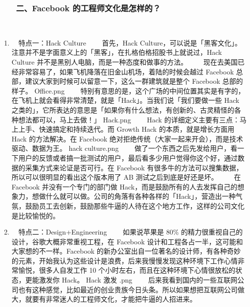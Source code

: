 \documentclass[11pt]{ctexart}
\begin{document}
\subsubsection{　　二、Facebook 的工程师文化是怎样的？}
\label{sec:orgheadline22}
　

\begin{enumerate}
\item 　特点一：Hack Culture
\label{sec:orgheadline19}
　　首先，Hack Culture，可以说是「黑客文化」。注意并不是字面意义上的「黑客」，在扎格伯格招股书上就说过，Hack Culture 并不是黑别人电脑，而是一种态度和做事的方法。
　　现在去美国已经非常容易了，如果飞机降落在旧金山机场，着陆的时候会越过 Facebook 总部，建议大家到时候可以留意一下，这么一群建筑就是整个 Facebook 总部的样子。
Office.png
　　特别有意思的是，这个广场的中间位置其实是有字的，在飞机上就会看得非常清楚，就是「Hack」。当我们说「我们要做一些 Hack 之类的」，它所表达的意思是「如果你有什么想法，有创新的、古灵精怪的各种想法都可以，马上去做！」
Hack.png
　　Hack 的详细定义主要有三点：马上上手、快速搞定和持续迭代。而 Growth Hack 的本质，就是增长方面用 Hack 的方法解决。在 Facebook 绝对拒绝传统（大家一起来开会），而是技术驱动、数据为王。
hack culture.png
　　做了一个东西之后先发给用户，看一下用户的反馈或者搞一批测试的用户，最后看多少用户觉得你这个好，通过数据的采集方式来论证是否可行。在 Facebook 有很多牛的方法可以搜集数据，所以可以很明显的看出这个版本用了 AB 测试之后到底是好还是坏。
　　在 Facebook 并没有一个专门的部门做 Hack，而是鼓励所有的人去发挥自己的想象力，想做什么就可以做。公司的角落有各种各样的「Hack」，营造出一种气氛，鼓励员工去创新，鼓励那些牛逼的人待在这个地方工作，这样的公司文化是比较愉悦的。
　

\item 　特点二：Design+Engineering
\label{sec:orgheadline20}
　　如果说苹果是 80\% 的精力很重视自己的设计，谷歌大概非常重视工程，在 Facebook 设计和工程各占一半，这可能和大家想的不一样。Facebook 的新办公室出自一位著名的设计师，有各种奇妙的元素，开始我认为这些设计是浪费，后来我慢慢发现这种环境下工作心情非常愉悦，很多人自发工作 10 个小时左右，而且在这种环境下心情很放松的状态，更能激发你 Hack。
Hack 激发 .png
　　后来我看到国内的一些互联网公司也有这种感觉，比如最近的创业贵族今日头条。所以如果想把互联网公司做大，就要有非常迷人的工程师文化，才能把牛逼的人招进来。
　


\end{enumerate}
\end{document}
